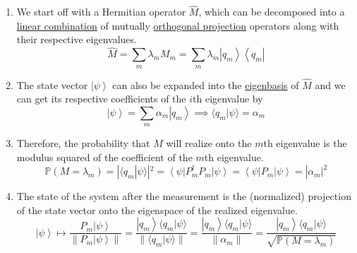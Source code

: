 \documentclass{article}
\newcommand{\ket}[1]{\ensuremath{\left|#1\right\rangle}}
\newcommand{\bra}[1]{\ensuremath{\left\langle#1\right|}}
\newcommand{\braket}[2]{\langle #1 | #2 \rangle}
\begin{document}
      \begin{enumerate} 
        \item We start off with a Hermitian operator $\hat{M}$, which can be decomposed into a \hyperref[lin-def:linear-combination]{linear combination} of mutually \hyperref[lin-def:orthogonal-projection]{orthogonal projection} operators along with their respective eigenvalues. 
          \begin{equation} 
            \hat{M} = \sum_m \lambda_m M_m = \sum_{m} \lambda_m \ket{q_m} \bra{q_m}
          \end{equation}

        \item The state vector $\ket{\psi}$ can also be expanded into the \hyperref[lin-def:eigenbasis]{eigenbasis} of $\hat{M}$ and we can get its respective coefficients of the $i$th eigenvalue by 
          \begin{equation} 
            \ket{\psi} = \sum_{m} \alpha_m \ket{q_m} \implies \braket{q_m}{\psi} = \alpha_m
          \end{equation}

        \item Therefore, the probability that $M$ will realize onto the $m$th eigenvalue is the modulus squared of the coefficient of the $m$th eigenvalue. 
          \begin{equation} 
            \mathbb{P}(M = \lambda_m) = |\braket{q_m}{\psi}|^2 = \bra{\psi} P_m^\dagger P_m \ket{\psi} = \bra{\psi} P_m \ket{\psi} = |\alpha_m|^2
          \end{equation}

        \item The state of the system after the measurement is the (normalized) projection of the state vector onto the eigenspace of the realized eigenvalue. 
          \begin{equation} 
            \ket{\psi} \mapsto \frac{P_m \ket{\psi}}{\|P_m \ket{\psi}\|} = \frac{\ket{q_m} \braket{q_m}{\psi}}{\|\braket{q_m}{\psi}\|} = \frac{\ket{q_m} \braket{q_m}{\psi}}{\|\alpha_m\|} = \frac{\ket{q_m} \braket{q_m}{\psi}}{\sqrt{\mathbb{P}(M = \lambda_m)}}
          \end{equation}
      \end{enumerate}
\end{document}
